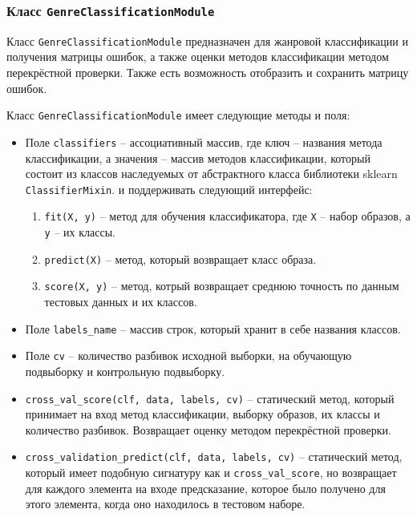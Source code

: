 \subsubsection{Класс \texttt{GenreClassificationModule}}

Класс \texttt{GenreClassificationModule} предназначен для жанровой классификации и получения матрицы ошибок, а также оценки методов классификации методом перекрёстной проверки. Также есть возможность отобразить и сохранить матрицу ошибок.


Класс \texttt{GenreClassificationModule} имеет следующие методы и поля:

\begin{itemize}
\item{Поле \texttt{classifiers} -- ассоциативный массив, где ключ -- названия метода классификации, а значения -- массив методов классификации, который состоит из классов наследуемых от абстрактного класса библиотеки sklearn \texttt{ClassifierMixin}. и поддерживать следующий интерфейс:}
\begin{enumerate}[label=\arabic*.]
\item \texttt{fit(X, y)} -- метод для обучения классификатора, где \texttt{X} -- набор образов, а \texttt{y} -- их классы.
\item \texttt{predict(X)} -- метод, который возвращает класс образа.
\item \texttt{score(X, y)} -- метод, котрый возвращает среднюю точность по данным тестовых данных и их классов.
\end{enumerate}
\item{Поле \texttt{labels\_name} -- массив строк, который хранит в себе названия классов. }
\item{Поле \texttt{cv} -- количество разбивок исходной выборки, на обучающую подвыборку и контрольную подвыборку.}

\item{\texttt{cross\_val\_score(clf, data, labels, cv)} -- статический метод, который принимает на вход метод классификации, выборку образов, их классы и количество разбивок. Возвращает оценку методом перекрёстной проверки.}
\item{\texttt{cross\_validation\_predict(clf, data, labels, cv)} -- статический метод, который имеет подобную сигнатуру как и \texttt{cross_val_score}, но возвращает для каждого элемента на входе предсказание, которое было получено для этого элемента, когда оно находилось в тестовом наборе. }


\end{itemize}
